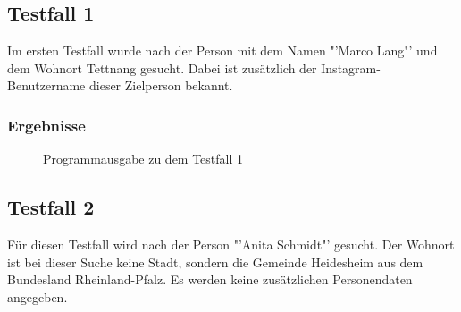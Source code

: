 	\subsection{Testfall 1}
	\label{subsec:Testfall1}
	Im ersten Testfall wurde nach der Person mit dem Namen "'Marco Lang"' und dem Wohnort Tettnang gesucht. Dabei ist zusätzlich der Instagram-Benutzername dieser Zielperson bekannt.
	\subsubsection{Ergebnisse}
		\begin{figure}[h!]
			\caption{Programmausgabe zu dem Testfall 1}
		\end{figure}
		\FloatBarrier
	\subsection{Testfall 2}
	\label{subsec:Testfall2}
	Für diesen Testfall wird nach der Person "'Anita Schmidt"' gesucht. Der Wohnort ist bei dieser Suche keine Stadt, sondern die Gemeinde Heidesheim aus dem Bundesland Rheinland-Pfalz. Es werden keine zusätzlichen Personendaten angegeben.
